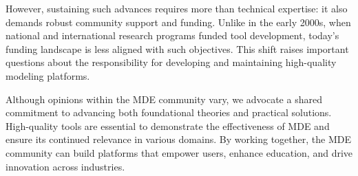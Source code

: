 However, sustaining such advances requires more than technical expertise: it also demands robust community support and funding. Unlike in the early 2000s, when national and international research programs funded tool development, today’s funding landscape is less aligned with such objectives. This shift raises important questions about the responsibility for developing and maintaining high-quality modeling platforms.  

Although opinions within the MDE community vary, we advocate a shared commitment to advancing both foundational theories and practical solutions. High-quality tools are essential to demonstrate the effectiveness of MDE and ensure its continued relevance in various domains. By working together, the MDE community can build platforms that empower users, enhance education, and drive innovation across industries.  




 
